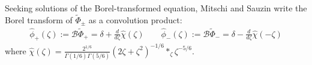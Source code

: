\documentclass{article}
\newcommand{\series}[1]{\tilde{#1}}
\newcommand{\borel}{\mathcal{B}}
\theoremstyle{definition}
\theoremstyle{plain}
\begin{document}
Seeking solutions of the Borel-transformed equation, Mitschi and Sauzin write the Borel transform of $\series{\Phi}_{\pm}$ as a convolution product:
\begin{align*}
\hat{\phi}_+(\zeta):=\borel\series{\Phi}_+=\delta+\frac{d}{d\zeta}\hat{\chi}(\zeta)  \qquad \hat{\phi}_-(\zeta):=\borel\series{\Phi}_-=\delta-\frac{d}{d\zeta}\hat{\chi}(-\zeta)
\end{align*}
 where $\hat{\chi}(\zeta)=\frac{2^{1/6}}{\Gamma(1/6)\Gamma(5/6)}(2\zeta+\zeta^2)^{-1/6} \ast_{\zeta} \zeta^{-5/6}$.
%
\end{document}
